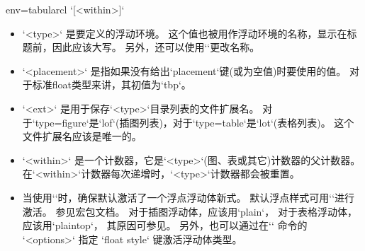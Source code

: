 \begin{tableobject}{env=tabular}{cl}
\DescribeMacro{\newfloat}
`[<within>]`
\begin{itemize}
\item `<type>` 是要定义的浮动环境。
	这个值也被用作浮动环境的名称，显示在标题前，因此应该大写。
	另外，还可以使用``更改名称。
\item `<placement>` 是指如果没有给出`placement`键(或为空值)时要使用的值。
	对于标准float类型来讲，其初值为`tbp`。
\item `<ext>` 是用于保存`<type>`目录列表的文件扩展名。
	对于`type=figure`是`lof`(插图列表)，对于`type=table`是`lot`(表格列表)。
	这个文件扩展名应该是唯一的。
\item `<within>` 是一个计数器，它是`<type>`(图、表或其它)计数器的父计数器。
	在`<within>`计数器每次递增时，`<type>`计数器都会被重置。
\item 当使用`\newfloat`时，确保默认激活了一个浮点浮动体新式。
	默认浮点样式可用``进行激活。
	参见宏包文档\autocite{float}。
	对于插图浮动体，应该用`plain`，
	对于表格浮动体，应该用`plaintop`，
	其原因可参见\autocite{texexchange_caption_position}。
	另外，也可以通过在`\NewObjectStyle` 命令的 `<options>` 指定 `float style` 键激活浮动体类型。
\end{itemize}


\end{tableobject}
